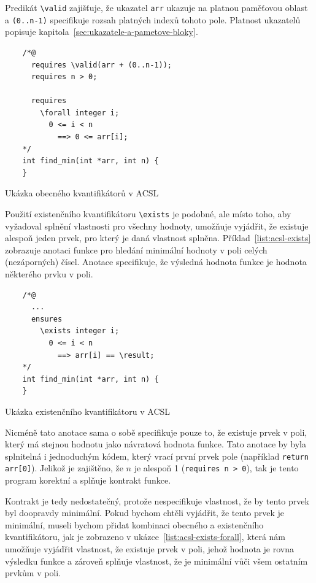 Predikát \texttt{\textbackslash valid} zajišťuje,
že ukazatel \texttt{arr} ukazuje na platnou paměťovou oblast
a \texttt{(0..n-1)} specifikuje rozsah platných indexů tohoto pole.
Platnost ukazatelů popisuje kapitola~\ref{sec:ukazatele-a-pametove-bloky}.

\begin{listing}[H]
    \begin{verbatim}
    /*@
      requires \valid(arr + (0..n-1));
      requires n > 0;

      requires
        \forall integer i;
          0 <= i < n
            ==> 0 <= arr[i];
    */
    int find_min(int *arr, int n) {
    }
    \end{verbatim}
    \caption{Ukázka obecného kvantifikátorů v ACSL}
    \label{list:acsl-forall}
\end{listing}


Použití existenčního kvantifikátoru \texttt{\textbackslash exists} je podobné,
ale místo toho, aby vyžadoval splnění vlastnosti pro všechny hodnoty,
umožňuje vyjádřit, že existuje alespoň jeden prvek, pro který je daná vlastnost splněna.
Příklad~\ref{list:acsl-exists} zobrazuje anotaci funkce pro hledání minimální hodnoty v poli celých (nezáporných) čísel.
Anotace specifikuje, že výsledná hodnota funkce je hodnota některého prvku v poli.

\begin{listing}[H]
    \begin{verbatim}
    /*@
      ...
      ensures
        \exists integer i;
          0 <= i < n
            ==> arr[i] == \result;
    */
    int find_min(int *arr, int n) {
    }
    \end{verbatim}
    \caption{Ukázka existenčního kvantifikátoru v ACSL}
    \label{list:acsl-exists}
\end{listing}

Nicméně tato anotace sama o sobě specifikuje pouze to, že existuje prvek v poli,
který má stejnou hodnotu jako návratová hodnota funkce.
Tato anotace by byla splnitelná i jednoduchým kódem, který vrací první prvek pole (například \texttt{return arr[0]}).
Jelikož je zajištěno, že $n$ je alespoň 1 (\texttt{requires n > 0}),
tak je tento program korektní a splňuje kontrakt funkce.



Kontrakt je tedy nedostatečný, protože nespecifikuje vlastnost,
že by tento prvek byl doopravdy minimální.
Pokud bychom chtěli vyjádřit, že tento prvek je minimální,
museli bychom přidat kombinaci obecného a existenčního kvantifikátoru,
jak je zobrazeno v ukázce~\ref{list:acsl-exists-forall},
která nám umožňuje vyjádřit vlastnost, že existuje prvek v poli,
jehož hodnota je rovna výsledku funkce a zároveň splňuje vlastnost,
že je minimální vůči všem ostatním prvkům v poli.

